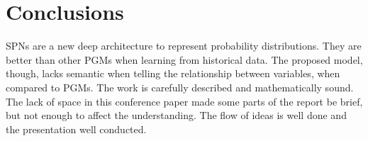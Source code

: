 \section{Conclusions}
\label{sec:conc}

SPNs are a new deep architecture to represent probability distributions.
They are better than other PGMs when learning from historical data.
The proposed model, though, lacks semantic when telling the relationship between variables, when compared to PGMs.
The work is carefully described and mathematically sound.
The lack of space in this conference paper made some parts of the report be brief, but not enough to affect the understanding.
The flow of ideas is well done and the presentation well conducted.